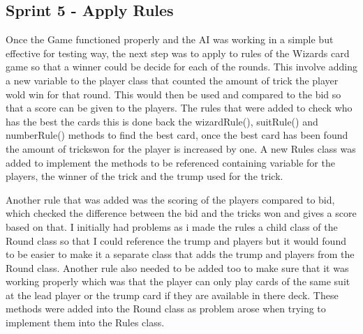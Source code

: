 \subsection{Sprint 5 - Apply Rules}
Once the Game functioned properly and the AI was working in a simple but effective for testing way, the next step was to apply to rules of the Wizards card game so that a winner could be decide for each of the rounds. This involve adding a new variable to the player class that counted the amount of trick the player wold win for that round. This would then be used and compared to the bid so that a score can be given to the players. The rules that were added to check who has the best the cards this is done back the wizardRule(), suitRule() and numberRule() methods to find the best card, once the best card has been found the amount of trickswon for the player is increased by one. A new Rules class was added to implement the methods to be referenced containing variable for the players, the winner of the trick and the trump used for the trick.

Another rule that was added was the scoring of the players compared to bid, which checked the difference between the bid and the tricks won and gives a score based on that. I initially had problems as i made the rules a child class of the Round class so that I could reference the trump and players but it would found to be easier to make it a separate class that adds the trump and players from the Round class. Another rule also needed to be added too to make sure that it was working properly which was that the player can only play cards of the same suit at the lead player or the trump card if they are available in there deck. These methods were added into the Round class as problem arose when trying to implement them into the Rules class.
